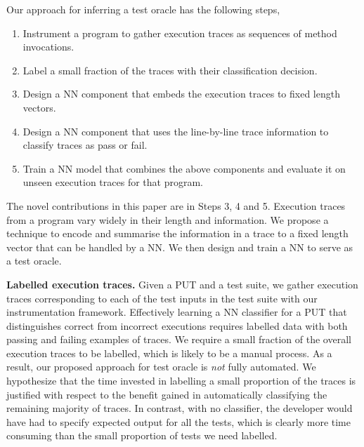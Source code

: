 Our approach for inferring a test oracle has the following steps, 
\begin{enumerate}[itemsep = 0pt, topsep = 0pt, partopsep=0pt]
\item Instrument a program to gather execution traces as sequences of method invocations. %
\item Label a small fraction of the traces with their classification decision. %
\item Design a NN component that embeds the execution traces to fixed length vectors.
\item Design a NN component that uses the line-by-line trace information to classify traces as pass or fail.
\item Train a NN model that combines the above components and evaluate it on unseen execution traces for that program. 
\end{enumerate}
The novel contributions in this paper are in Steps 3, 4 and 5. Execution traces from a program vary widely in their length and information. We propose a technique to encode and summarise the information in a trace to a fixed length vector that can be handled by a NN. We then design and train a NN to serve as a test oracle.  


\textbf{Labelled execution traces.} Given a PUT and a test suite, we gather execution traces corresponding to each of the test inputs in the test suite with our instrumentation framework. Effectively learning a NN classifier for a PUT that distinguishes correct from incorrect executions requires labelled data with both passing and failing examples of traces. 
We require a small fraction of the overall execution traces to be labelled, which is likely to be a manual process. 
As a result, our proposed approach for test oracle is \emph{not} fully automated.
We hypothesize that the time invested in labelling a small proportion of the traces is justified with respect to the benefit gained in automatically classifying the remaining majority of traces. 
In contrast, with no classifier, the developer would have had to specify expected output for all the tests, which is clearly more time consuming than the small proportion of tests we need labelled. 

